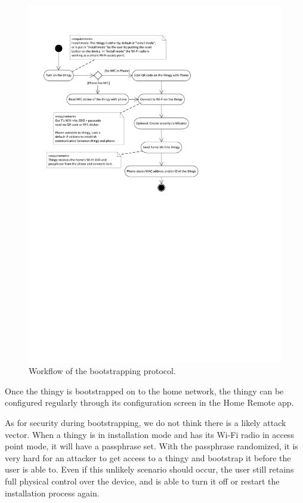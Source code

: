 \documentclass{ubicomp2012}
\begin{document}
\begin{figure}[th]
\begin{center}
\includegraphics[width=0.90\columnwidth]{figures/installation-workflow.pdf}
\end{center}
\caption{Workflow of the bootstrapping protocol.}
\label{fig:installworkflow}
\end{figure}

Once the thingy is bootstrapped on to the home network, the thingy can be configured regularly through its configuration screen in the Home Remote app.

As for security during bootstrapping, we do not think there is a likely attack vector. When a thingy is in installation mode and has its Wi-Fi radio in access point mode, it will have a passphrase set. With the passphrase randomized, it is very hard for an attacker to get access to a thingy and bootstrap it before the user is able to. Even if this unlikely scenario should occur, the user still retains full physical control over the device, and is able to turn it off or restart the installation process again.
\end{document}

